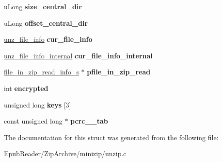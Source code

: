 \begin{DoxyCompactItemize}
\item 
\hypertarget{structunz__s_a60b803a02e17ae46755cb94026ae973a}{u\-Long {\bfseries size\-\_\-central\-\_\-dir}}\label{structunz__s_a60b803a02e17ae46755cb94026ae973a}

\item 
\hypertarget{structunz__s_ac6c37ef70549769fa59bca623565d78f}{u\-Long {\bfseries offset\-\_\-central\-\_\-dir}}\label{structunz__s_ac6c37ef70549769fa59bca623565d78f}

\item 
\hypertarget{structunz__s_ab1963897ac959ca0f9b4208c573c2795}{\hyperlink{structunz__file__info__s}{unz\-\_\-file\-\_\-info} {\bfseries cur\-\_\-file\-\_\-info}}\label{structunz__s_ab1963897ac959ca0f9b4208c573c2795}

\item 
\hypertarget{structunz__s_a36625697385b9a675f02a446fa5ba583}{\hyperlink{structunz__file__info__internal__s}{unz\-\_\-file\-\_\-info\-\_\-internal} {\bfseries cur\-\_\-file\-\_\-info\-\_\-internal}}\label{structunz__s_a36625697385b9a675f02a446fa5ba583}

\item 
\hypertarget{structunz__s_a7a5f0568475ad9a36ee2c1f3972406f0}{\hyperlink{structfile__in__zip__read__info__s}{file\-\_\-in\-\_\-zip\-\_\-read\-\_\-info\-\_\-s} $\ast$ {\bfseries pfile\-\_\-in\-\_\-zip\-\_\-read}}\label{structunz__s_a7a5f0568475ad9a36ee2c1f3972406f0}

\item 
\hypertarget{structunz__s_ae50c5145b776e6b2d68a078adbb9ad52}{int {\bfseries encrypted}}\label{structunz__s_ae50c5145b776e6b2d68a078adbb9ad52}

\item 
\hypertarget{structunz__s_a55d75bacbbaf31b1e796e222c0388f34}{unsigned long {\bfseries keys} \mbox{[}3\mbox{]}}\label{structunz__s_a55d75bacbbaf31b1e796e222c0388f34}

\item 
\hypertarget{structunz__s_a9efa28355c0dec769d07c5a52d70605d}{const unsigned long $\ast$ {\bfseries pcrc\-\_\-\_\-tab}}\label{structunz__s_a9efa28355c0dec769d07c5a52d70605d}

\end{DoxyCompactItemize}


The documentation for this struct was generated from the following file\-:\begin{DoxyCompactItemize}
\item 
Epub\-Reader/\-Zip\-Archive/minizip/unzip.\-c\end{DoxyCompactItemize}
